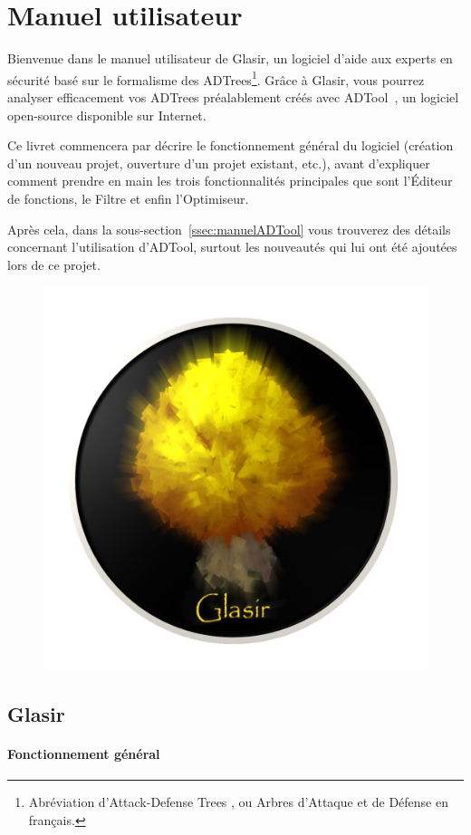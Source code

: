 \section{Manuel utilisateur}
\label{sec:manuel}

Bienvenue dans le manuel utilisateur de Glasir, un logiciel d'aide aux experts en sécurité basé sur le formalisme des ADTrees\footnote{Abréviation d'\og Attack-Defense Trees \fg{}, ou \og Arbres d'Attaque et de Défense\fg{} en français.}. Grâce à Glasir, vous pourrez analyser efficacement vos ADTrees préalablement créés avec ADTool~\cite{adtool}, un logiciel open-source disponible sur Internet.

Ce livret commencera par décrire le fonctionnement général du logiciel (création d'un nouveau projet, ouverture d'un projet existant, etc.), avant d'expliquer comment prendre en main les trois fonctionnalités principales que sont l'Éditeur de fonctions, le Filtre et enfin l'Optimiseur. 

Après cela, dans la {\sc sous-section}~\ref{ssec:manuelADTool} vous trouverez des détails concernant l'utilisation d'ADTool, surtout les nouveautés qui lui ont été ajoutées lors de ce projet.

\begin{figure}[!h]
        \centering
        \includegraphics[height=0.3\textwidth]{figure/glasir.png}
    \end{figure}

\subsection{Glasir}
\label{ssec:manuelGlasir}

\paragraph{Fonctionnement général}

